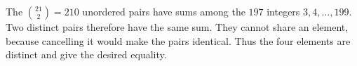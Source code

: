 The $\binom{21}{2}=210$ unordered pairs have sums among the $197$ integers $3,4,\ldots,199$. Two distinct pairs therefore have the same sum. They cannot share an element, because cancelling it would make the pairs identical. Thus the four elements are distinct and give the desired equality.
